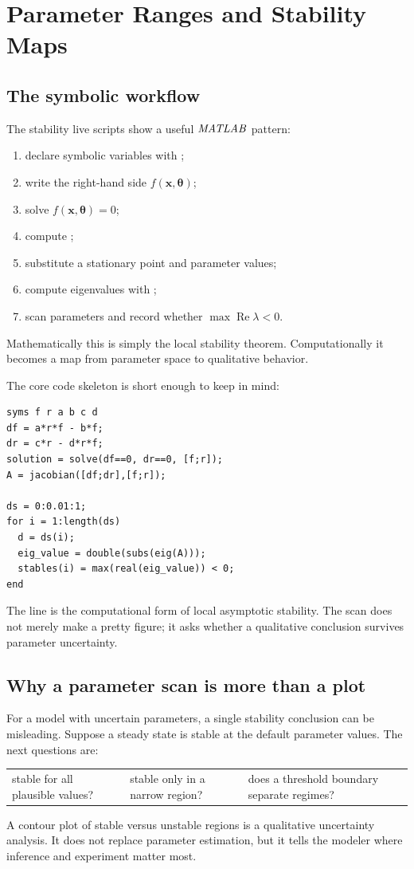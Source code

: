 \documentclass[a4paper]{article}
\newcommand{\vect}[1]{\boldsymbol{#1}}
\newcommand{\MATLAB}{\ensuremath{\pksym{MATLAB}}}
\newcommand{\code}[1]{\texttt{\detokenize{#1}}}
\begin{document}
\section{Parameter Ranges and Stability Maps}

\subsection{The symbolic workflow}

The stability live scripts show a useful \MATLAB{} pattern:
\begin{enumerate}[leftmargin=2em]
  \item declare symbolic variables with \code{syms};
  \item write the right-hand side \(f(\vect x,\vect\theta)\);
  \item solve \(f(\vect x,\vect\theta)=0\);
  \item compute \code{jacobian};
  \item substitute a stationary point and parameter values;
  \item compute eigenvalues with \code{eig};
  \item scan parameters and record whether \(\max\operatorname{Re}\lambda<0\).
\end{enumerate}
Mathematically this is simply the local stability theorem. Computationally it becomes a map from parameter space to qualitative behavior.

The core code skeleton is short enough to keep in mind:
\begin{verbatim}
syms f r a b c d
df = a*r*f - b*f;
dr = c*r - d*r*f;
solution = solve(df==0, dr==0, [f;r]);
A = jacobian([df;dr],[f;r]);

ds = 0:0.01:1;
for i = 1:length(ds)
  d = ds(i);
  eig_value = double(subs(eig(A)));
  stables(i) = max(real(eig_value)) < 0;
end
\end{verbatim}
The line \code{max(real(eig_value)) < 0} is the computational form of local asymptotic stability. The scan does not merely make a pretty figure; it asks whether a qualitative conclusion survives parameter uncertainty.

\subsection{Why a parameter scan is more than a plot}

For a model with uncertain parameters, a single stability conclusion can be misleading. Suppose a steady state is stable at the default parameter values. The next questions are:
\begin{center}
\begin{tabularx}{0.86\textwidth}{@{}XXX@{}}
stable for all plausible values? &
stable only in a narrow region? &
does a threshold boundary separate regimes?
\end{tabularx}
\end{center}
A contour plot of stable versus unstable regions is a qualitative uncertainty analysis. It does not replace parameter estimation, but it tells the modeler where inference and experiment matter most.
\end{document}

